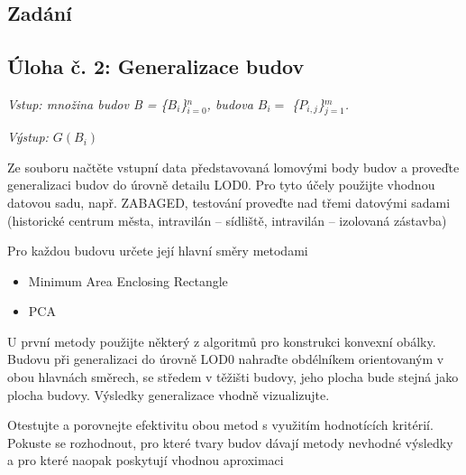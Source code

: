 \documentclass{article}
\begin{document}
\begin{spacing}{1.5}
\section*{Zadání}

\subsection*{\textbf{Úloha č. 2: Generalizace budov}}

\textit{Vstup: množina budov B = \{$B_i$\}$_{i=0}^n$, budova $B_i = $  \{$P_{i,j}$\}$_{j=1}^m$.}

\noindent\textit{Výstup: $G(B_i)$}


\noindent Ze souboru načtěte vstupní data představovaná lomovými body budov a proveďte generalizaci budov do úrovně detailu LOD0. Pro tyto účely použijte vhodnou datovou sadu, např. ZABAGED, testování proveďte nad třemi datovými sadami (historické centrum města, intravilán – sídliště, intravilán – izolovaná zástavba)

\noindent Pro každou budovu určete její hlavní směry metodami

\begin{itemize}
  \item Minimum Area Enclosing Rectangle
  \item PCA
\end{itemize}
 
\noindent U první metody použijte některý z algoritmů pro konstrukci konvexní obálky. Budovu při generalizaci do úrovně LOD0 nahraďte obdélníkem orientovaným v obou hlavnách směrech, se středem v těžišti budovy, jeho plocha bude stejná jako plocha budovy. Výsledky generalizace vhodně vizualizujte.

\noindent Otestujte a porovnejte efektivitu obou metod s využitím hodnotících kritérií. Pokuste se rozhodnout, pro které tvary budov dávají metody nevhodné výsledky a pro které naopak poskytují vhodnou aproximaci 



\end{spacing}
\end{document}

